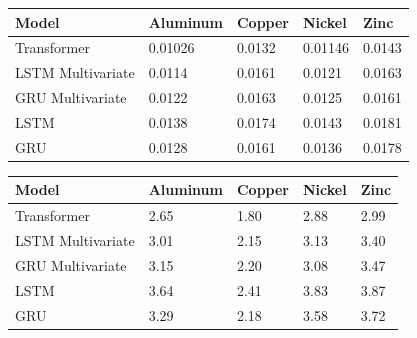 \documentclass[preprint,12pt]{elsarticle}
\begin{document}
\begin{table}
	{\begin{tabular}{|p{3cm}|p{2cm}|p{2cm}|p{2cm}|p{2cm}|} \hline
			\textbf{Model} & \textbf{Aluminum} & \textbf{Copper} & \textbf{Nickel} & \textbf{Zinc}\\ \hline 
			Transformer & 0.01026 & 0.0132 & 0.01146 & 0.0143\\ \hline 
			LSTM Multivariate & 0.0114 & 0.0161 & 0.0121 & 0.0163\\ \hline 
			GRU Multivariate & 0.0122 & 0.0163 & 0.0125 & 0.0161\\ \hline
			LSTM & 0.0138 & 0.0174 & 0.0143 & 0.0181\\ \hline
			GRU & 0.0128 & 0.0161 & 0.0136 & 0.0178\\ \hline
	\end{tabular}}
	\label{tab3}
\end{table}



\begin{table}
	{\begin{tabular}{|p{3cm}|p{2cm}|p{2cm}|p{2cm}|p{2cm}|} \hline
			\textbf{Model} & \textbf{Aluminum} & \textbf{Copper} & \textbf{Nickel} & \textbf{Zinc}\\ \hline 
			Transformer & 2.65 & 1.80 & 2.88 & 2.99\\ \hline 
			LSTM Multivariate & 3.01 & 2.15 & 3.13 & 3.40\\ \hline 
			GRU Multivariate & 3.15 & 2.20 & 3.08 & 3.47\\ \hline
			LSTM & 3.64 & 2.41 & 3.83 & 3.87\\ \hline
			GRU & 3.29 & 2.18 & 3.58 & 3.72\\ \hline
	\end{tabular}}
	\label{tab4}
\end{table}
\end{document}
